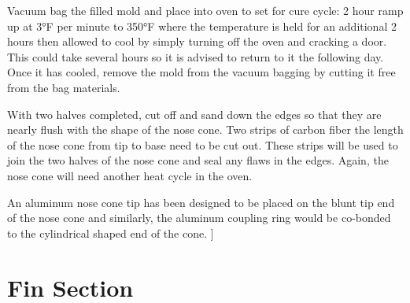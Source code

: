 \documentclass{aiaa-tc}%
\begin{document}
Vacuum bag the filled mold and place into oven to set for cure cycle: 2 hour ramp up at 3°F per minute to 350°F where the temperature is held for an additional 2 hours then allowed to cool by simply turning off the oven and cracking a door. This could take several hours so it is advised to return to it the following day. Once it has cooled, remove the mold from the vacuum bagging by cutting it free from the bag materials. 

With two halves completed, cut off and sand down the edges so that they are nearly flush with the shape of the nose cone. Two strips of carbon fiber the length of the nose cone from tip to base need to be cut out. These strips will be used to join the two halves of the nose cone and seal any flaws in the edges. Again, the nose cone will need another heat cycle in the oven. 

An aluminum nose cone tip has been designed to be placed on the blunt tip end of the nose cone and similarly, the aluminum coupling ring would be co-bonded to the cylindrical shaped end of the cone. ]

\section{Fin Section}


\end{document}
